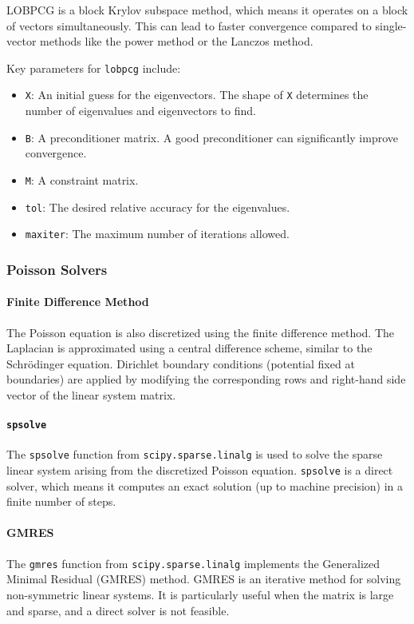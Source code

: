 \documentclass{article}
\begin{document}
LOBPCG is a block Krylov subspace method, which means it operates on a block of vectors simultaneously. This can lead to faster convergence compared to single-vector methods like the power method or the Lanczos method.

Key parameters for \texttt{lobpcg} include:
\begin{itemize}
    \item \texttt{X}: An initial guess for the eigenvectors. The shape of \texttt{X} determines the number of eigenvalues and eigenvectors to find.
    \item \texttt{B}: A preconditioner matrix. A good preconditioner can significantly improve convergence.
    \item \texttt{M}: A constraint matrix.
    \item \texttt{tol}: The desired relative accuracy for the eigenvalues.
    \item \texttt{maxiter}: The maximum number of iterations allowed.
\end{itemize}

\subsubsection{Poisson Solvers}

\paragraph{Finite Difference Method}
The Poisson equation is also discretized using the finite difference method. The Laplacian is approximated using a central difference scheme, similar to the Schrödinger equation. Dirichlet boundary conditions (potential fixed at boundaries) are applied by modifying the corresponding rows and right-hand side vector of the linear system matrix.

\paragraph{\texttt{spsolve}}
The \texttt{spsolve} function from \texttt{scipy.sparse.linalg} is used to solve the sparse linear system arising from the discretized Poisson equation. \texttt{spsolve} is a direct solver, which means it computes an exact solution (up to machine precision) in a finite number of steps.

\paragraph{GMRES}
The \texttt{gmres} function from \texttt{scipy.sparse.linalg} implements the Generalized Minimal Residual (GMRES) method. GMRES is an iterative method for solving non-symmetric linear systems. It is particularly useful when the matrix is large and sparse, and a direct solver is not feasible.
\end{document}
